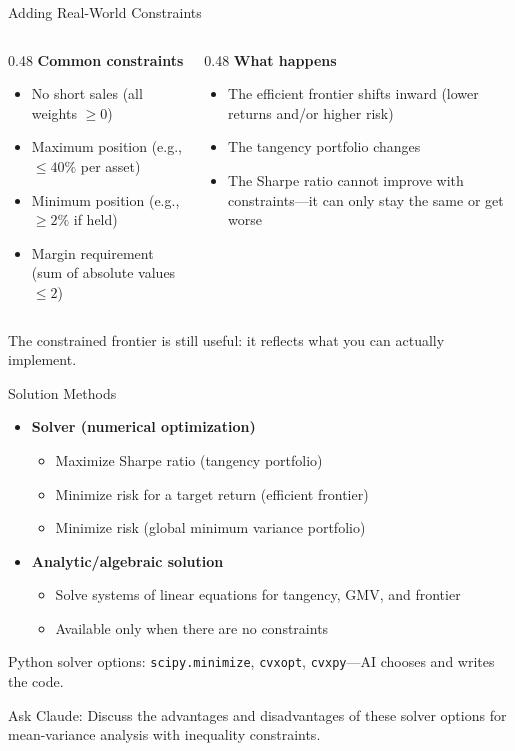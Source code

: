 \documentclass[aspectratio=169]{beamer}
\begin{document}
\begin{frame}{Adding Real-World Constraints}
\begin{columns}[T]
\begin{column}{0.48\textwidth}
\textbf{Common constraints}
\begin{itemize}
  \item No short sales (all weights $\geq 0$)
  \item Maximum position (e.g., $\leq 40\%$ per asset)
  \item Minimum position (e.g., $\geq 2\%$ if held)
  \item Margin requirement (sum of absolute values $\leq 2$)
\end{itemize}
\end{column}
\begin{column}{0.48\textwidth}
\textbf{What happens}
\begin{itemize}
  \item The efficient frontier shifts \alert{inward} (lower returns and/or higher risk)
  \item The tangency portfolio changes
  \item The Sharpe ratio cannot improve with constraints---it can only stay the same or get worse
\end{itemize}
\end{column}
\end{columns}
\vspace{0.3cm}
\alert{The constrained frontier is still useful: it reflects what you can actually implement.}
\end{frame}

\begin{frame}{Solution Methods}
\begin{itemize}
  \item \textbf{Solver (numerical optimization)}
    \begin{itemize}
      \item Maximize Sharpe ratio (tangency portfolio)
      \item Minimize risk for a target return (efficient frontier)
      \item Minimize risk (global minimum variance portfolio)
    \end{itemize}
  \item \textbf{Analytic/algebraic solution}
    \begin{itemize}
      \item Solve systems of linear equations for tangency, GMV, and frontier
      \item Available only when there are no constraints
    \end{itemize}
\end{itemize}

\vspace{0.3cm}
Python solver options: \texttt{scipy.minimize}, \texttt{cvxopt}, \texttt{cvxpy}---AI chooses and writes the code.

\vfill
\alert{Ask Claude:} \small Discuss the advantages and disadvantages of these solver options for mean-variance analysis with inequality constraints.
\end{frame}
\end{document}
